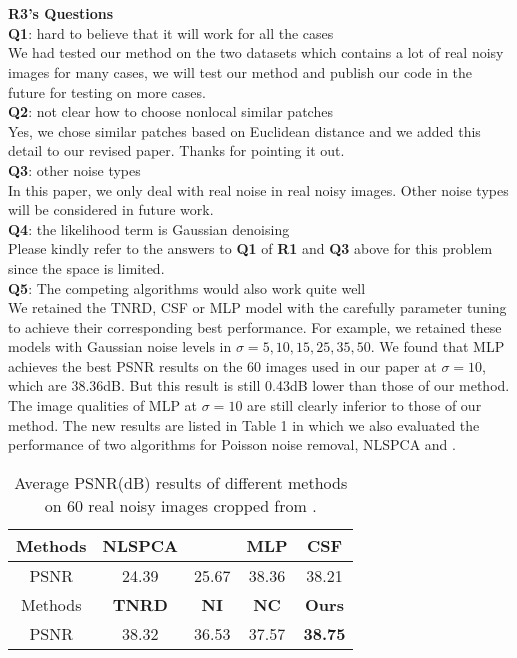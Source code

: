 \documentclass[10pt,twocolumn,letterpaper]{article}
\begin{document}
\\
\\
\textbf{R3's Questions}
\\
\textbf{Q1}: hard to believe that it will work for all the cases
\\
We had tested our method on the two datasets which contains a lot of real noisy images for many cases, we will test our method and publish our code in the future for testing on more cases.
\\
\textbf{Q2}: not clear how to choose nonlocal similar patches
\\
Yes, we chose similar patches based on Euclidean distance and we added this detail to our revised paper. Thanks for pointing it out.
\\
\textbf{Q3}: other noise types
\\
In this paper, we only deal with real noise in real noisy images. Other noise types will be considered in future work.
\\
\textbf{Q4}: the likelihood term is Gaussian denoising
\\
Please kindly refer to the answers to \textbf{Q1} of \textbf{R1} and \textbf{Q3} above for this problem since the space is limited. 
\\
\textbf{Q5}: The competing algorithms would also work quite well
\\
We retained the TNRD, CSF or MLP model with the carefully parameter tuning to achieve their corresponding best performance. For example, we retained these models with Gaussian noise levels in $\sigma = 5, 10, 15, 25, 35, 50$. We found that MLP achieves the best PSNR results on the 60 images used in our paper at $\sigma = 10$, which are 38.36dB. But this result is still 0.43dB lower than those of our method. The image qualities of MLP at $\sigma = 10$ are still clearly inferior to those of our method. The new results are listed in Table 1 in which we also evaluated the performance of two algorithms for Poisson noise removal, NLSPCA \cite{nlpca} and \cite{makitalo2013optimal}. 
\begin{table}\vspace{1.5mm}
\caption{Average PSNR(dB) results of different methods on 60 real noisy images cropped from \cite{crosschannel2016}.}
\vspace{-3mm}
\label{tab3}
\begin{center}
\renewcommand\arraystretch{1}
\begin{tabular}{|c||c|c|c|c|}
\hline
 Methods& \textbf{NLSPCA} & \cite{makitalo2013optimal} & \textbf{MLP}&\textbf{CSF}
\\
\hline
PSNR & 24.39  &  25.67 &  38.36 & 38.21
\\
\hline
Methods & \textbf{TNRD} & \textbf{NI} & \textbf{NC} &\textbf{Ours} 
\\
\hline
PSNR & 38.32  & 36.53 & 37.57 & {\textbf{{ 38.75}}}
\\
\hline
\end{tabular}
\end{center}\vspace{-4mm}
\end{table}
\end{document}
